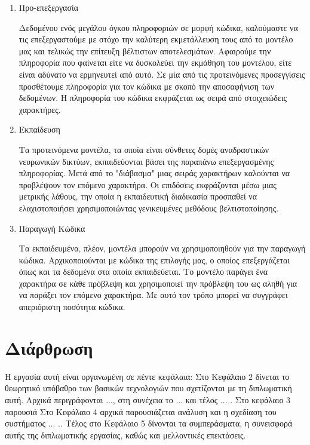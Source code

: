 \begin{enumerate}
\item Προ-επεξεργασία 

Δεδομένου ενός μεγάλου όγκου πληροφοριών σε μορφή κώδικα, καλούμαστε να τις επεξεργαστούμε με στόχο την καλύτερη εκμετάλλευση τους από το μοντέλο μας και τελικώς την επίτευξη βέλτιστων αποτελεσμάτων.
Αφαιρούμε την πληροφορία που φαίνεται είτε να δυσκολεύει την εκμάθηση του μοντέλου, είτε είναι αδύνατο να ερμηνευτεί από αυτό.
Σε μία από τις προτεινόμενες προσεγγίσεις προσθέτουμε πληροφορία για τον κώδικα με σκοπό την αποσαφήνιση των δεδομένων.
Η πληροφορία του κώδικα εκφράζεται ως σειρά από στοιχειώδεις χαρακτήρες.

\item Εκπαίδευση 

Τα προτεινόμενα μοντέλα, τα οποία είναι σύνθετες δομές αναδραστικών νευρωνικών δικτύων, εκπαιδεύονται βάσει της παραπάνω επεξεργασμένης πληροφορίας.
Μετά από το "διάβασμα" μιας σειράς χαρακτήρων καλούνται να προβλέψουν τον επόμενο χαρακτήρα. Οι επιδόσεις εκφράζονται μέσω μιας μετρικής λάθους, την οποία η εκπαιδευτική διαδικασία προσπαθεί να ελαχιστοποιήσει χρησιμοποιώντας γενικευμένες μεθόδους βελτιστοποίησης.  


\item Παραγωγή Κώδικα 

Τα εκπαιδευμένα, πλέον, μοντέλα μπορούν να χρησιμοποιηθούν για την παραγωγή κώδικα.
Αρχικοποιούνται με κώδικα της επιλογής μας, ο οποίος επεξεργάζεται όπως και τα δεδομένα στα οποία εκπαιδεύεται.
Το μοντέλο παράγει ένα χαρακτήρα σε κάθε πρόβλεψη και χρησιμοποιεί την πρόβλεψη του ως αληθή για να παράξει τον επόμενο χαρακτήρα.
Με αυτό τον τρόπο μπορεί να συγγράφει απεριόριστη ποσότητα κώδικα.
\end{enumerate}

\section{Διάρθρωση}
Η εργασία αυτή είναι οργανωμένη σε πέντε κεφάλαια: Στο Κεφάλαιο 2
δίνεται το θεωρητικό υπόβαθρο των βασικών τεχνολογιών που
σχετίζονται με τη διπλωματική αυτή. Αρχικά περιγράφονται ..., στη συνέχεια το ... και τέλος ... . 
Στο κεφάλαιο 3 παρουσιά
Στο Κεφάλαιο 4 αρχικά παρουσιάζεται ανάλυση και η σχεδίαση του συστήματος ... .. Τέλος στο Κεφάλαιο 5 δίνονται τα συμπεράσματα, η συνεισφορά αυτής της
διπλωματικής εργασίας, καθώς και μελλοντικές επεκτάσεις.